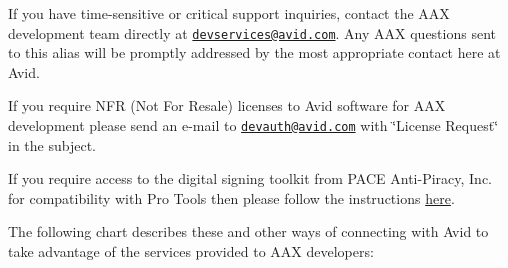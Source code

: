 If you have time-\/sensitive or critical support inquiries, contact the A\+A\+X development team directly at \href{mailto:devservices@avid.com}{\tt devservices@avid.\+com}. Any A\+A\+X questions sent to this alias will be promptly addressed by the most appropriate contact here at Avid.

If you require N\+F\+R (Not For Resale) licenses to Avid software for A\+A\+X development please send an e-\/mail to \href{mailto:devauth@avid.com}{\tt devauth@avid.\+com} with \char`\"{}\+License Request\char`\"{} in the subject.

If you require access to the digital signing toolkit from P\+A\+C\+E Anti-\/\+Piracy, Inc. for compatibility with Pro Tools then please follow the instructions \hyperlink{a00360_subsection__digital_signature_}{here}.

The following chart describes these and other ways of connecting with Avid to take advantage of the services provided to A\+A\+X developers\+:

